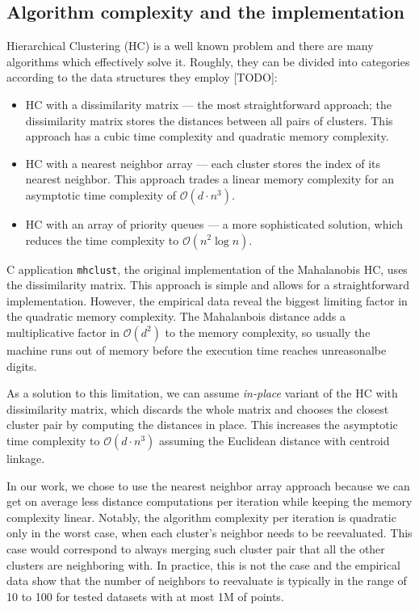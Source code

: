 \subsection{Algorithm complexity and the implementation}

Hierarchical Clustering (HC) is a well known problem and there are many algorithms which effectively solve it. Roughly, they can be divided into categories according to the data structures they employ [TODO]:
\begin{itemize}
    \item HC with a dissimilarity matrix --- the most straightforward approach; the dissimilarity matrix stores the distances between all pairs of clusters. This approach has a cubic time complexity and quadratic memory complexity.
    \item HC with a nearest neighbor array --- each cluster stores the index of its nearest neighbor. This approach trades a linear memory complexity for an asymptotic time complexity of $\mathcal{O}(d \cdot n^3)$.
    \item HC with an array of priority queues --- a more sophisticated solution, which reduces the time complexity to $\mathcal{O}(n^2 \log n)$.
\end{itemize}

C application \texttt{mhclust}, the original implementation of the Mahalanobis HC, uses the dissimilarity matrix. This approach is simple and allows for a straightforward implementation. However, the empirical data reveal the biggest limiting factor in the quadratic memory complexity. The Mahalanbois distance adds a multiplicative factor in $\mathcal{O}(d^2)$ to the memory complexity, so usually the machine runs out of memory before the execution time reaches unreasonalbe digits.

As a solution to this limitation, we can assume \emph{in-place} variant of the HC with dissimilarity matrix, which discards the whole matrix and chooses the closest cluster pair by computing the distances in place. This increases the asymptotic time complexity to $\mathcal{O}(d \cdot n^3)$ assuming the Euclidean distance with centroid linkage.

In our work, we chose to use the nearest neighbor array approach because we can get on average less distance computations per iteration while keeping the memory complexity linear. Notably, the algorithm complexity per iteration is quadratic only in the worst case, when each cluster's neighbor needs to be reevaluated. This case would correspond to always merging such cluster pair that all the other clusters are neighboring with. In practice, this is not the case and the empirical data show that the number of neighbors to reevaluate is typically in the range of 10 to 100 for tested datasets with at most 1M of points.

